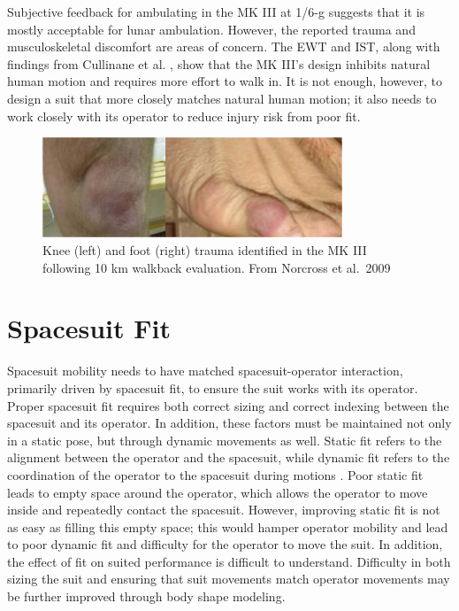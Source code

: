 \documentclass[defaultstyle,11pt]{comps}
\begin{document}
Subjective feedback for ambulating in the MK III at 1/6-g suggests that it is mostly acceptable for lunar ambulation.
However, the reported trauma and musculoskeletal discomfort are areas of concern.
The EWT and IST, along with findings from Cullinane et al. \citep{Cullinane2017a}, show that the MK III's design inhibits natural human motion and requires more effort to walk in.
It is not enough, however, to design a suit that more closely matches natural human motion; it also needs to work closely with its operator to reduce injury risk from poor fit.

\begin{figure}
\hypertarget{fig:B-Trauma}{%
\centering
\includegraphics[width=0.8\textwidth,height=\textheight]{../fig/Background/Trauma.png}
\caption{Knee (left) and foot (right) trauma identified in the MK III following 10 km walkback evaluation. From Norcross et al.~2009}\label{fig:B-Trauma}
}
\end{figure}

\hypertarget{spacesuit-fit}{%
\section{Spacesuit Fit}\label{spacesuit-fit}}

Spacesuit mobility needs to have matched spacesuit-operator interaction, primarily driven by spacesuit fit, to ensure the suit works with its operator.
Proper spacesuit fit requires both correct sizing and correct indexing between the spacesuit and its operator.
In addition, these factors must be maintained not only in a static pose, but through dynamic movements as well.
Static fit refers to the alignment between the operator and the spacesuit, while dynamic fit refers to the coordination of the operator to the spacesuit during motions \citep{Stirling2020}.
Poor static fit leads to empty space around the operator, which allows the operator to move inside and repeatedly contact the spacesuit.
However, improving static fit is not as easy as filling this empty space; this would hamper operator mobility and lead to poor dynamic fit and difficulty for the operator to move the suit.
In addition, the effect of fit on suited performance is difficult to understand.
Difficulty in both sizing the suit and ensuring that suit movements match operator movements may be further improved through body shape modeling.
\end{document}
